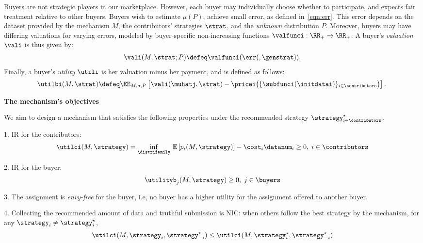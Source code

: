 Buyers are not strategic players in our marketplace.
However, each buyer may individually choose whether to participate, and expects fair treatment relative to other buyers.
Buyers wish to estimate $\mu(P)$, \ie achieve small error, as defined in~\eqref{eqn:err}.
This error depends on the dataset provided by the mechanism $M$,
the contributors' strategies $\strat$, and the \emph{unknown} distribution $P$.
Moreover, buyers may have differing valuations for varying errors, modeled by buyer-specific non-increasing functions $\valfunci: \RR_+ \rightarrow \RR_+$.
A buyer's \emph{valuation} $\vali$ is thus given by:
\begin{align}
    \vali(M, \strat; P) \defeq \valfunci(\err(, \genstrat)).
    \label{eqn:buyerval}
\end{align}
Finally, a buyer's \emph{utility} $\utili$ is her valuation minus her payment,
and is defined as follows:
\begin{align}
\hspace{-0.07in}
    \utilbi(M, \strat) \defeq \EE_{M, \sigma, P}\left[ \vali(\muhatj, \strat) - \pricei\big(\{\subfunci(\initdatai)\}_{i\in\contributors}\big) \right].
    \hspace{-0.03in}
    \label{eqn:buyerutil}
\end{align}

\textbf{The mechanism's objectives}

We aim to design a mechanism that satisfies the following properties under the recommended strategy $\strategy^{\star}_{i \in \contributors}$.



1. IR for the contributors: \[\utilci (M,\strategy) = \underset{\distrifamily}{\inf} \ \mathbb{E}\left[  p_i(M,\strategy)\right]-\cost_i \datanum_i \geq 0 , \; i \in \contributors \] 

2. IR for the buyer: \[\utilityb_j(M,\strategy  ) \geq 0 , \; j \in \buyers  \] 

3. The assignment is \emph{envy-free} for the buyer, i.e, no buyer has a higher utility for the assignment offered to another buyer.

4. Collecting the recommended amount of data and truthful submission is NIC: when others follow the best strategy by the mechanism, for any $\strategy_i \neq \strategy_i^{\star} $,
\[ \utilci (M,\strategy_i,\strategy_{-i}^{\star}) \leq \utilci (M,\strategy_i^{\star},\strategy_{-i}^{\star})  \]


